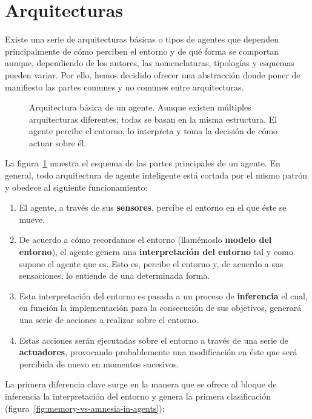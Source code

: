 \section{Arquitecturas}

Existe una serie de arquitecturas básicas o tipos de agentes que dependen principalmente de cómo perciben el entorno y de qué forma se comportan aunque, dependiendo de los autores, las nomenclaturas, tipologías y esquemas pueden variar. Por ello, hemos decidido ofrecer una abstracción donde poner de manifiesto las partes comunes y no comunes entre arquitecturas.

\begin{figure}
	\caption[Arquitectura básica de un agente]{Arquitectura básica de un agente. Aunque existen múltiples arquitecturas diferentes, todas se basan en la misma estructura. El agente percibe el entorno, lo interpreta y toma la decisión de cómo actuar sobre él.}
	\label{fig:agent-basic-architecture}
\end{figure}

La figura~\ref{fig:agent-basic-architecture} muestra el esquema de las partes principales de un agente. En general, todo arquitectura de agente inteligente está cortada por el mismo patrón y obedece al siguiente funcionamiento:

\begin{enumerate}
	\item El agente, a través de sus \textbf{sensores}, percibe el entorno en el que éste se mueve.
	\item De acuerdo a cómo recordamos el entorno (llamémoslo \textbf{modelo del entorno}), el agente genera una \textbf{interpretación del entorno} tal y como supone el agente que es. Esto es, percibe el entorno y, de acuerdo a sus sensaciones, lo entiende de una determinada forma.
	\item Esta interpretación del entorno es pasada a un proceso de \textbf{inferencia} el cual, en función la implementación para la consecución de sus objetivos, generará una serie de acciones a realizar sobre el entorno.
	\item Estas acciones serán ejecutadas sobre el entorno a través de una serie de \textbf{actuadores}, provocando probablemente una modificación en éste que será percibida de nuevo en momentos sucesivos.
\end{enumerate}

La primera diferencia clave surge en la manera que se ofrece al bloque de inferencia la interpretación del entorno y genera la primera clasificación (figura~\ref{fig:memory-vs-amnesia-in-agents}):


